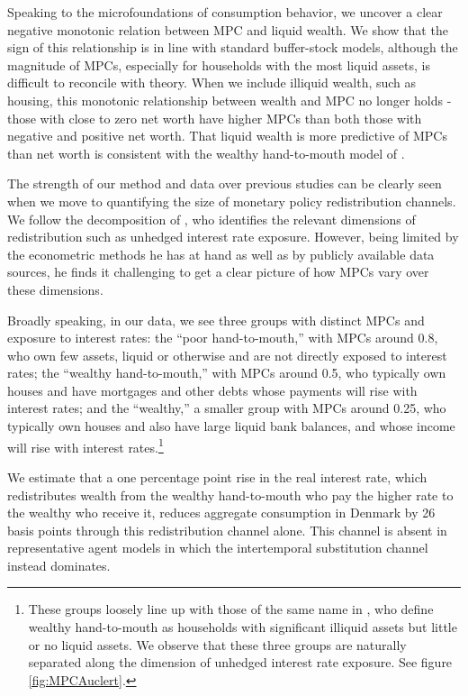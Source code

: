 \documentclass[titlepage]{\econtex}\newcommand{\texname}{ConsumptionHeterogeneity}
\begin{document}
Speaking to the microfoundations of consumption behavior, we uncover a clear negative monotonic relation between MPC and liquid wealth. We show that the sign of this relationship is in line with standard buffer-stock models, although the magnitude of MPCs, especially for households with the most liquid assets, is difficult to reconcile with theory. When we include illiquid wealth, such as housing, this monotonic relationship between wealth and MPC no longer holds - those with close to zero net worth have higher MPCs than both those with negative and positive net worth. That liquid wealth is more predictive of MPCs than net worth is consistent with the wealthy hand-to-mouth model of \cite{violante_wealthy_2014}.

The strength of our method and data over previous studies can be clearly seen when we move to quantifying the size of monetary policy redistribution channels. We follow the decomposition of \cite{auclert_monetary_2017}, who identifies the relevant dimensions of redistribution such as unhedged interest rate exposure. However, being limited by the econometric methods he has at hand as well as by publicly available data sources, he finds it challenging to get a clear picture of how MPCs vary over these dimensions.

Broadly speaking, in our data, we see three groups with distinct MPCs and exposure to interest rates: the ``poor hand-to-mouth,'' with MPCs around 0.8, who own few assets, liquid or otherwise and are not directly exposed to interest rates; the ``wealthy hand-to-mouth,'' with MPCs around 0.5, who typically own houses and have mortgages and other debts whose payments will rise with interest rates; and the ``wealthy,'' a smaller group with MPCs around 0.25, who typically own houses and also have large liquid bank balances, and whose income will rise with interest rates.\footnote{These groups loosely line up with those of the same name in \cite{violante_wealthy_2014}, who define wealthy hand-to-mouth as households with significant illiquid assets but little or no liquid assets. We observe that these three groups are naturally separated along the dimension of unhedged interest rate exposure. See figure \ref{fig:MPCAuclert}.}

We estimate that a one percentage point rise in the real interest rate, which redistributes wealth from the wealthy hand-to-mouth who pay the higher rate to the wealthy who receive it, reduces aggregate consumption in Denmark by 26 basis points through this redistribution channel alone. This channel is absent in representative agent models in which the intertemporal substitution channel instead dominates.
\end{document}
